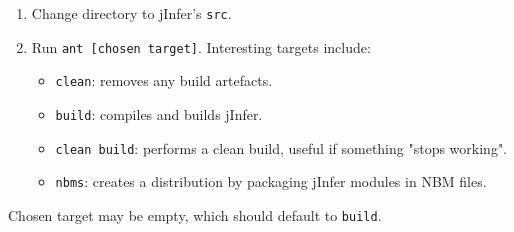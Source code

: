 \documentclass[a4paper,10pt,oneside]{article}
\begin{document}
\begin{enumerate}\item 
 Change directory to jInfer's \texttt{src}.
  \item Run \texttt{ant [chosen target]}. Interesting targets include:
    \begin{itemize}\item 
        \texttt{clean}: removes any build artefacts.
      \item \texttt{build}: compiles and builds jInfer.
      \item \texttt{clean build}: performs a clean build, useful if something "stops working".
      \item \texttt{nbms}: creates a distribution by packaging jInfer modules in NBM files.
      \end{itemize}
  \end{enumerate}\par Chosen target may be empty, which should default to \texttt{build}.
 

 
\end{document}
